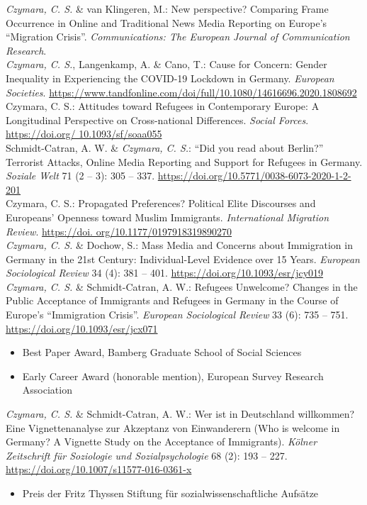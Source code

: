 \documentclass[11pt, a4paper]{article}
\newcommand{\years}[1]{\marginnote{~~#1}}
\begin{document}
\years{2020}\textit{Czymara, C. S.} \& van Klingeren, M.: New perspective? Comparing Frame Occurrence in Online and Traditional News Media Reporting on Europe's ``Migration Crisis''. \textit{Communications: The European Journal of Communication Research}.\\
\textit{Czymara, C. S.}, Langenkamp, A. \& Cano, T.: Cause for Concern: Gender Inequality in Experiencing the COVID-19 Lockdown in Germany. \textit{European Societies}. \href{https://www.tandfonline.com/doi/full/10.1080/14616696.2020.1808692}{https://www.tandfonline.com/doi/full/10.1080/14616696.2020.1808692}\\
Czymara, C. S.: Attitudes toward Refugees in Contemporary Europe: A Longitudinal Perspective on Cross-national Differences. \textit{Social Forces}. \href{https://doi.org/10.1093/sf/soaa055}{https://doi.org/ 10.1093/sf/soaa055}\\
Schmidt-Catran, A. W. \& \textit{Czymara, C. S.}: ``Did you read about Berlin?'' Terrorist Attacks, Online Media Reporting and Support for Refugees in Germany. \textit{Soziale Welt} 71 (2 -- 3): 305 -- 337. \href{https://doi.org/10.5771/0038-6073-2020-1-2-201}{https://doi.org/10.5771/0038-6073-2020-1-2-201}\\
\years{2019}Czymara, C. S.: Propagated Preferences? Political Elite Discourses and Europeans’ Openness toward Muslim Immigrants. \textit{International Migration Review}. \href{https://doi.org/10.1177/0197918319890270}{https://doi. org/10.1177/0197918319890270}\\
\years{2018}\textit{Czymara, C. S.} \& Dochow, S.: Mass Media and Concerns about Immigration in Germany in the 21st Century: Individual-Level Evidence over 15 Years. \textit{European Sociological Review} 34 (4): 381 -- 401. \href{https://doi.org/10.1093/esr/jcy019}{https://doi.org/10.1093/esr/jcy019}\\
\years{2017}\textit{Czymara, C. S.} \& Schmidt-Catran, A. W.: Refugees Unwelcome? Changes in the Public Acceptance of Immigrants and Refugees in Germany in the Course of Europe's ``Immigration Crisis''. \textit{European Sociological Review} 33 (6): 735 -- 751. \href{https://doi.org/10.1093/esr/jcx071}{https://doi.org/10.1093/esr/jcx071}
\begin{itemize}[noitemsep,nolistsep]
	\item Best Paper Award, Bamberg Graduate School of Social Sciences
	\item Early Career Award (honorable mention), European Survey Research Association
\end{itemize}
\years{2016}\textit{Czymara, C. S.} \& Schmidt-Catran, A. W.: Wer ist in Deutschland willkommen? Eine Vignettenanalyse zur Akzeptanz von Einwanderern (Who is welcome in Germany? A Vignette Study on the Acceptance of Immigrants). \textit{K\"olner Zeitschrift f\"ur Soziologie und Sozialpsychologie} 68 (2): 193 -- 227. \href{https://doi.org/10.1007/s11577-016-0361-x}{https://doi.org/10.1007/s11577-016-0361-x}
\begin{itemize}[nolistsep]
	\item Preis der Fritz Thyssen Stiftung für sozialwissenschaftliche Aufsätze
\end{itemize}
\hspace{1em}
\end{document}
